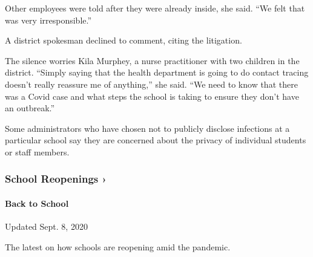Other employees were told after they were already inside, she said. ``We
felt that was very irresponsible.''

A district spokesman declined to comment, citing the litigation.

The silence worries Kila Murphey, a nurse practitioner with two children
in the district. ``Simply saying that the health department is going to
do contact tracing doesn't really reassure me of anything,'' she said.
``We need to know that there was a Covid case and what steps the school
is taking to ensure they don't have an outbreak.''

Some administrators who have chosen not to publicly disclose infections
at a particular school say they are concerned about the privacy of
individual students or staff members.

\href{https://www.nytimes3xbfgragh.onion/spotlight/schools-reopening?action=click\&pgtype=Article\&state=default\&region=MAIN_CONTENT_3\&context=storylines_keepup}{}

\hypertarget{school-reopenings-}{%
\subsubsection{School Reopenings ›}\label{school-reopenings-}}

\hypertarget{back-to-school}{%
\paragraph{Back to School}\label{back-to-school}}

Updated Sept. 8, 2020

The latest on how schools are reopening amid the pandemic.

